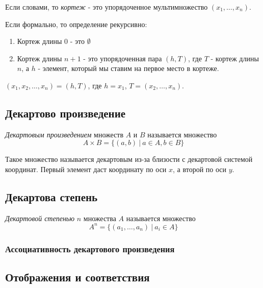 \begin{definition}
	Если словами, то \textit{кортеж} - это упорядоченное мультимножество $(x_1, \dots, x_n)$.
	
	Если формально, то определение рекурсивно:
	\begin{enumerate}
		\item Кортеж длины 0 - это $\emptyset$
		\item Кортеж длины $n + 1$ - это упорядоченная пара $(h, T)$, где $T$ - кортеж длины $n$, а $h$ - элемент, который мы ставим на первое место в кортеже.
	\end{enumerate}
\end{definition}

\begin{example}
	$(x_1, x_2, \dots, x_n) = (h, T)$, где $h = x_1$, $T = (x_2, \dots, x_n)$.
\end{example}

\subsection{Декартово произведение}

\begin{definition}
	\textit{Декартовым произведением} множеств $A$ и $B$ называется множество
	$$
	A \times B = \{(a, b)\ |\ a \in A, b \in B\}
	$$
\end{definition}

\begin{note}
	Такое множество называется декартовым из-за близости с декартовой системой координат. Первый элемент даст координату по оси $x$, а второй по оси $y$.
\end{note}

\subsection{Декартова степень}

\begin{definition}
	\textit{Декартовой степенью} $n$ множества $A$ называется множество
	$$
	A^n = \{(a_1, \dots, a_n)\ |\ a_i \in A\}
	$$
\end{definition}

\subsubsection*{Ассоциативность декартового произведения}

\subsection{Отображения и соответствия}

